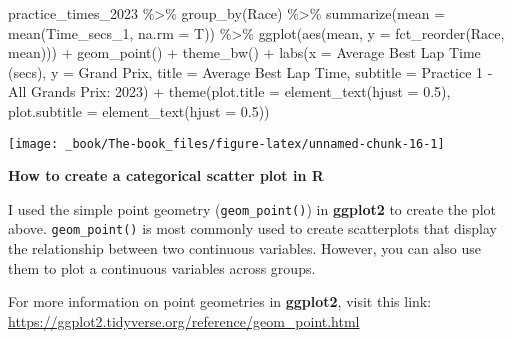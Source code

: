 \documentclass[
]{book}
\newenvironment{Shaded}{\begin{snugshade}}{\end{snugshade}}
\newcommand{\AttributeTok}[1]{\textcolor[rgb]{0.77,0.63,0.00}{#1}}
\newcommand{\FloatTok}[1]{\textcolor[rgb]{0.00,0.00,0.81}{#1}}
\newcommand{\FunctionTok}[1]{\textcolor[rgb]{0.00,0.00,0.00}{#1}}
\newcommand{\NormalTok}[1]{#1}
\newcommand{\SpecialCharTok}[1]{\textcolor[rgb]{0.00,0.00,0.00}{#1}}
\newcommand{\StringTok}[1]{\textcolor[rgb]{0.31,0.60,0.02}{#1}}
\begin{document}
\begin{Shaded}
\begin{Highlighting}[]
\NormalTok{practice\_times\_2023 }\SpecialCharTok{\%\textgreater{}\%}
  \FunctionTok{group\_by}\NormalTok{(Race) }\SpecialCharTok{\%\textgreater{}\%}
  \FunctionTok{summarize}\NormalTok{(}\AttributeTok{mean =} \FunctionTok{mean}\NormalTok{(Time\_secs\_1, }\AttributeTok{na.rm =}\NormalTok{ T)) }\SpecialCharTok{\%\textgreater{}\%}
  \FunctionTok{ggplot}\NormalTok{(}\FunctionTok{aes}\NormalTok{(mean, }\AttributeTok{y =} \FunctionTok{fct\_reorder}\NormalTok{(Race, mean))) }\SpecialCharTok{+}
    \FunctionTok{geom\_point}\NormalTok{() }\SpecialCharTok{+}
    \FunctionTok{theme\_bw}\NormalTok{() }\SpecialCharTok{+}
  \FunctionTok{labs}\NormalTok{(}\AttributeTok{x =} \StringTok{\textquotesingle{}Average Best Lap Time (secs)\textquotesingle{}}\NormalTok{,}
       \AttributeTok{y =} \StringTok{\textquotesingle{}Grand Prix\textquotesingle{}}\NormalTok{,}
       \AttributeTok{title =} \StringTok{\textquotesingle{}Average Best Lap Time\textquotesingle{}}\NormalTok{,}
       \AttributeTok{subtitle =} \StringTok{\textquotesingle{}Practice 1 {-} All Grands Prix: 2023\textquotesingle{}}\NormalTok{) }\SpecialCharTok{+}
  \FunctionTok{theme}\NormalTok{(}\AttributeTok{plot.title =} \FunctionTok{element\_text}\NormalTok{(}\AttributeTok{hjust =} \FloatTok{0.5}\NormalTok{),}
        \AttributeTok{plot.subtitle =} \FunctionTok{element\_text}\NormalTok{(}\AttributeTok{hjust =} \FloatTok{0.5}\NormalTok{))}
\end{Highlighting}
\end{Shaded}

\begin{center}\texttt{[image: \_book/The-book\_files/figure-latex/unnamed-chunk-16-1]} \end{center}

\begin{blackbox}

\begin{center}
\textbf{How to create a categorical scatter plot in R}

\end{center}

I used the simple point geometry (\texttt{geom\_point()}) in \textbf{ggplot2} to create the plot above. \texttt{geom\_point()} is most commonly used to create scatterplots that display the relationship between two continuous variables. However, you can also use them to plot a continuous variables across groups.

For more information on point geometries in \textbf{ggplot2}, visit this link: \url{https://ggplot2.tidyverse.org/reference/geom_point.html}

\end{blackbox}
\end{document}
